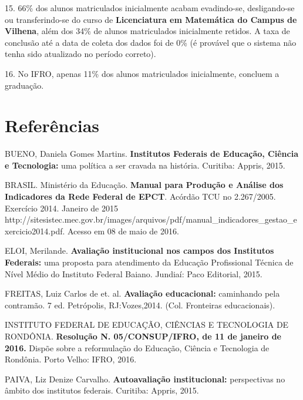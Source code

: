 \documentclass[article,12pt,onesidea,4paper,english,brazil]{abntex2}
\begin{document}
	15. 66\% dos alunos matriculados inicialmente acabam evadindo-se, desligando-se ou
	transferindo-se do curso de \textbf{Licenciatura em Matemática do Campus de Vilhena}, além
	dos 34\% de alunos matriculados inicialmente retidos. A taxa de conclusão até a data de
	coleta dos dados foi de 0\% (é provável que o sistema não tenha sido atualizado no período
	correto).
	
	16. No IFRO, apenas 11\% dos alunos matriculados inicialmente, concluem a graduação.
	
	\section*{Referências}
	\sloppy
	\noindent BUENO, Daniela Gomes Martins. \textbf{Institutos Federais de Educação, Ciência e Tecnologia:}
	uma política a ser cravada na história. Curitiba: Appris, 2015.
	
	\noindent BRASIL. Ministério da Educação. \textbf{Manual para Produção e Análise dos Indicadores da
	Rede Federal de EPCT}. Acórdão TCU no 2.267/2005. Exercício 2014. Janeiro de 2015
	http://sitesistec.mec.gov.br/images/arquivos/pdf/manual\_indicadores\_gestao\_exercicio2014.pdf.
	Acesso em 08 de maio de 2016.
	
	\noindent ELOI, Merilande. \textbf{Avaliação institucional nos campos dos Institutos Federais:} uma proposta
	para atendimento da Educação Profissional Técnica de Nível Médio do Instituto Federal
	Baiano. Jundiaí: Paco Editorial, 2015.
	
	\noindent FREITAS, Luiz Carlos de et. al. \textbf{Avaliação educacional:} caminhando pela contramão. 7 ed.
	Petrópolis, RJ:Vozes,2014. (Col. Fronteiras educacionais).
	
	\noindent INSTITUTO FEDERAL DE EDUCAÇÃO, CIÊNCIAS E TECNOLOGIA DE RONDÔNIA.
	\textbf{Resolução N. 05/CONSUP/IFRO, de 11 de janeiro de 2016.} Dispõe sobre a reformulação do
	Educação, Ciência e Tecnologia de Rondônia. Porto Velho: IFRO, 2016.
	
	\noindent PAIVA, Liz Denize Carvalho. \textbf{Autoavaliação institucional:} perspectivas no âmbito dos
	institutos federais. Curitiba: Appris, 2015.
	
\end{document}
